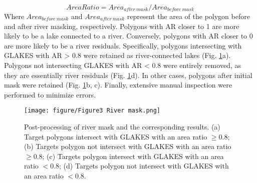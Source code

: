\documentclass[preprint,12pt,authoryear]{elsarticle}
\begin{document}
\begin{equation}
Area Ratio = Area_{after\ mask}/Area_{before\ mask}
\end{equation}
Where $Area_{before\ mask}$ and $Area_{after\ mask}$ represent the area of the polygon before and after river masking, respectively. Polygons with AR closer to 1 are more likely to be a lake connected to a river. Conversely, polygons with AR closer to 0 are more likely to be a river residuals. Specifically, polygons intersecting with GLAKES with AR > 0.8 were retained as river-connected lakes (Fig. \ref{fig:Fig3}a). Polygons not intersecting GLAKES with AR < 0.8 were entirely removed, as they are essentially river residuals (Fig. \ref{fig:Fig3}d). In other cases, polygons after initial mask were retained (Fig. \ref{fig:Fig3}b, c). Finally, extensive manual inspection were performed to minimize errors.

\begin{figure}[h]
    \centering
    \texttt{[image: figure/Figure3 River mask.png]}
    \caption{Post-processing of river mask and the corresponding results. (a) Target polygons intersect with GLAKES with an area ratio $\geq$0.8; (b) Targets polygon not intersect with GLAKES with an area ratio $\geq$0.8; (c) Targets polygon intersect with GLAKES with an area ratio $<$0.8; (d) Targets polygon not intersect with GLAKES with an area ratio $<$0.8.}
    \label{fig:Fig3}
\end{figure}
\end{document}

